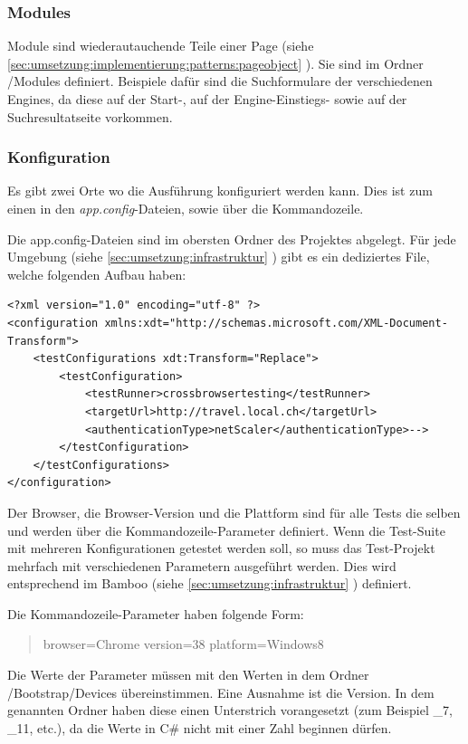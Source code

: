 \subsubsection{Modules}
Module sind wiederautauchende Teile einer Page (siehe \cref{sec:umsetzung:implementierung:patterns:pageobject} ). Sie sind im Ordner /Modules definiert. Beispiele dafür sind die Suchformulare der verschiedenen Engines, da diese auf der Start-, auf der Engine-Einstiegs- sowie auf der Suchresultatseite vorkommen.

\subsubsection{Konfiguration}
\label{sec:umsetzung:Implementierung:Architektur:Konfiguration}
Es gibt zwei Orte wo die Ausführung konfiguriert werden kann. Dies ist zum einen in den \textit{app.config}-Dateien, sowie über die Kommandozeile.

Die app.config-Dateien sind im obersten Ordner des Projektes abgelegt. Für jede Umgebung (siehe \cref{sec:umsetzung:infrastruktur} ) gibt es ein dediziertes File, welche folgenden Aufbau haben:

\lstset{language=xml}
\begin{lstlisting}
<?xml version="1.0" encoding="utf-8" ?>
<configuration xmlns:xdt="http://schemas.microsoft.com/XML-Document-Transform">
	<testConfigurations xdt:Transform="Replace">
		<testConfiguration>
			<testRunner>crossbrowsertesting</testRunner>
			<targetUrl>http://travel.local.ch</targetUrl>
			<authenticationType>netScaler</authenticationType>-->
		</testConfiguration>
	</testConfigurations>
</configuration>
\end{lstlisting}

Der Browser, die Browser-Version und die Plattform sind für alle Tests die selben und werden über die Kommandozeile-Parameter definiert. Wenn die Test-Suite mit mehreren Konfigurationen getestet werden soll, so muss das Test-Projekt mehrfach mit verschiedenen Parametern ausgeführt werden. Dies wird entsprechend im Bamboo (siehe \cref{sec:umsetzung:infrastruktur} ) definiert.

Die Kommandozeile-Parameter haben folgende Form:
\begin{quote}
browser=Chrome version=38 platform=Windows8
\end{quote}
Die Werte der Parameter müssen mit den Werten in dem Ordner /Bootstrap/Devices übereinstimmen. Eine Ausnahme ist die Version. In dem genannten Ordner haben diese einen Unterstrich vorangesetzt (zum Beispiel \_7, \_11, etc.), da die Werte in C\# nicht mit einer Zahl beginnen dürfen.

